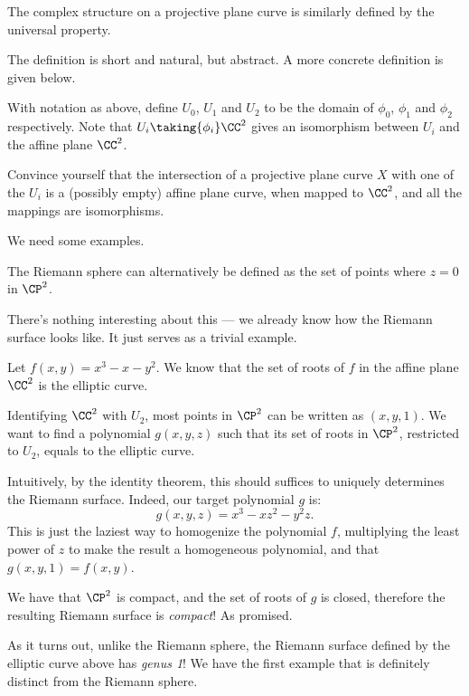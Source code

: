 The complex structure on a projective plane curve is similarly defined by the universal property.

The definition is short and natural, but abstract. A more concrete definition is given below.
\begin{ques}
	With notation as above, define $U_0$, $U_1$ and $U_2$ to be the domain of $\phi_0$, $\phi_1$ and
	$\phi_2$ respectively.
	Note that $U_i \taking{\phi_i} \CC^2$ gives an isomorphism between $U_i$ and the affine plane
	$\CC^2$.

	Convince yourself that the intersection of a projective plane curve $X$ with one of the $U_i$ is
	a (possibly empty) affine plane curve, when mapped to $\CC^2$, and all the mappings are
	isomorphisms.
\end{ques}

We need some examples.

\begin{example}
	The Riemann sphere can alternatively be defined as the set of points where $z = 0$ in $\CP^2$.

	There's nothing interesting about this --- we already know how the Riemann surface looks like.
	It just serves as a trivial example.
\end{example}

\begin{example}
	Let $f(x, y) = x^3-x-y^2$. We know that the set of roots of $f$ in the affine plane $\CC^2$ is
	the elliptic curve.

	Identifying $\CC^2$ with $U_2$, most points in $\CP^2$ can be written as $(x, y, 1)$.
	We want to find a polynomial $g(x, y, z)$ such that its set of roots in $\CP^2$, restricted to
	$U_2$, equals to the elliptic curve.

	Intuitively, by the identity theorem, this should suffices to uniquely determines the Riemann
	surface. Indeed, our target polynomial $g$ is:
	\[ g(x, y, z) = x^3-xz^2-y^2 z.  \]
	This is just the laziest way to homogenize the polynomial $f$, multiplying the least power of
	$z$ to make the result a homogeneous polynomial, and that $g(x, y, 1) = f(x, y)$.

	We have that $\CP^2$ is compact, and the set of roots of $g$ is closed, therefore the resulting
	Riemann surface is \emph{compact}! As promised.
\end{example}

As it turns out, unlike the Riemann sphere, the Riemann surface defined by the elliptic curve above
has \emph{genus 1}! We have the first example that is definitely distinct from
the Riemann sphere.

